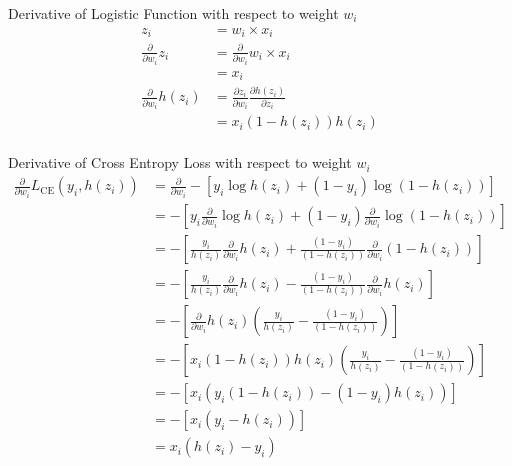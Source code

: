 Derivative of Logistic Function with respect to weight $w_i$\\
\begin{align*}
    z_i &= w_i \times x_i \\
    \frac{\partial}{\partial w_i} z_i &= \frac{\partial}{\partial w_i} w_i \times x_i\\
    &= x_i\\
    \frac{\partial}{\partial w_i} h(z_i) &= \frac{\partial z_i}{\partial w_i}\frac{\partial h(z_i)}{\partial z_i} \\
    &= x_i (1 - h(z_i)) h(z_i)\\
\end{align*}

Derivative of Cross Entropy Loss with respect to weight $w_i$\\
\begin{align*}
    \frac{\partial}{\partial w_i} L_{\text{CE}}(y_i, h(z_i)) &=
    \frac{\partial}{\partial w_i} -\left[y_i \log h(z_i) + (1-y_i) \log (1-h(z_i))\right]\\
    &= -\left[ y_i \frac{\partial}{\partial w_i} \log h(z_i) + (1-y_i) \frac{\partial}{\partial w_i} \log (1 - h(z_i)) \right]\\
    &= -\left[ \frac{y_i}{h(z_i)} \frac{\partial}{\partial w_i} h(z_i) + \frac{(1-y_i)}{(1-h(z_i))} \frac{\partial}{\partial w_i} (1 - h(z_i)) \right]\\
    &= -\left[ \frac{y_i}{h(z_i)} \frac{\partial}{\partial w_i} h(z_i) - \frac{(1-y_i)}{(1-h(z_i))} \frac{\partial}{\partial w_i} h(z_i)\right]\\
    &= -\left[ \frac{\partial}{\partial w_i} h(z_i) \left(\frac{y_i}{h(z_i)} - \frac{(1-y_i)}{(1-h(z_i))}\right)\right]\\
    &= -\left[ x_i(1-h(z_i))h(z_i) \left(\frac{y_i}{h(z_i)} - \frac{(1-y_i)}{(1-h(z_i))}\right)\right]\\
    &= -\left[ x_i \left(y_i(1-h(z_i)) - (1-y_i)h(z_i)\right)\right]\\
    &= -\left[ x_i (y_i - h(z_i))\right]\\
    &= x_i (h(z_i) - y_i) \\
\end{align*}

